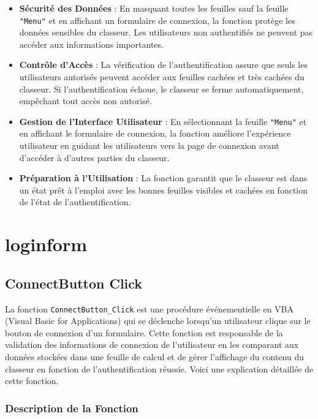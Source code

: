 \documentclass[a4paper, oneside, 12pt, final]{extreport}
\begin{document}
\begin{itemize}
    \item \textbf{Sécurité des Données} : En masquant toutes les feuilles sauf la feuille \texttt{"Menu"} et en affichant un formulaire de connexion, la fonction protège les données sensibles du classeur. Les utilisateurs non authentifiés ne peuvent pas accéder aux informations importantes.
    \item \textbf{Contrôle d'Accès} : La vérification de l'authentification assure que seuls les utilisateurs autorisés peuvent accéder aux feuilles cachées et très cachées du classeur. Si l'authentification échoue, le classeur se ferme automatiquement, empêchant tout accès non autorisé.
    \item \textbf{Gestion de l'Interface Utilisateur} : En sélectionnant la feuille \texttt{"Menu"} et en affichant le formulaire de connexion, la fonction améliore l'expérience utilisateur en guidant les utilisateurs vers la page de connexion avant d'accéder à d'autres parties du classeur.
    \item \textbf{Préparation à l'Utilisation} : La fonction garantit que le classeur est dans un état prêt à l'emploi avec les bonnes feuilles visibles et cachées en fonction de l'état de l'authentification.
\end{itemize}

\section{loginform}

\subsection{ConnectButton Click}

La fonction \texttt{ConnectButton\_Click} est une procédure événementielle en VBA (Visual Basic for Applications) qui se déclenche lorsqu'un utilisateur clique sur le bouton de connexion d'un formulaire. Cette fonction est responsable de la validation des informations de connexion de l'utilisateur en les comparant aux données stockées dans une feuille de calcul et de gérer l'affichage du contenu du classeur en fonction de l'authentification réussie. Voici une explication détaillée de cette fonction.

\subsubsection{Description de la Fonction}
\end{document}
